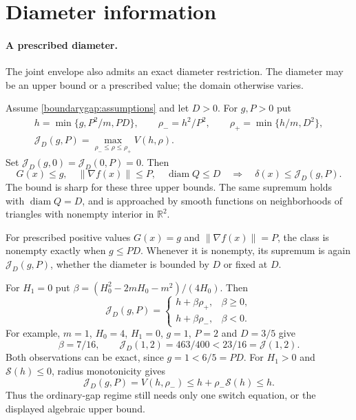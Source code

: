 \section{Diameter information}
\label{compact:diameter}

\paragraph{A prescribed diameter.}
The joint envelope also admits an exact diameter restriction. The
diameter may be an upper bound or a prescribed value; the domain
otherwise varies.

\begin{theorem}
\label{jointdiam:main}
Assume \eqref{boundarygap:assumptions} and let $D>0$. For $g,P>0$ put
\begin{equation}\label{jointdiam:definition}
 \begin{gathered}
 h=\min\{g,P^2/m,PD\},\qquad
 \rho_-=h^2/P^2,\qquad \rho_+=\min\{h/m,D^2\},\\
 \mathcal J_D(g,P)=\max_{\rho_-\le\rho\le\rho_+}V(h,\rho).
 \end{gathered}
\end{equation}
Set $\mathcal J_D(g,0)=\mathcal J_D(0,P)=0$. Then
\[
 G(x)\le g,\quad \|\nabla f(x)\|\le P,\quad
 \operatorname{diam}Q\le D
 \quad\Longrightarrow\quad
 \delta(x)\le\mathcal J_D(g,P).
\]
The bound is sharp for these three upper bounds. The same supremum
holds with $\operatorname{diam}Q=D$, and is approached by smooth
functions on neighborhoods of triangles with nonempty interior in
$\mathbb R^2$.

For prescribed positive values $G(x)=g$ and $\|\nabla f(x)\|=P$,
the class is nonempty exactly when $g\le PD$. Whenever it is
nonempty, its supremum is again $\mathcal J_D(g,P)$, whether the
diameter is bounded by $D$ or fixed at $D$.
\end{theorem}

For $H_1=0$ put
$\beta=(H_0^2-2mH_0-m^2)/(4H_0)$. Then
\begin{equation}\label{jointdiam:constant}
 \mathcal J_D(g,P)=
 \begin{cases}
 h+\beta\rho_+,&\beta\ge0,\\
 h+\beta\rho_-,&\beta<0.
 \end{cases}
\end{equation}
For example, $m=1$, $H_0=4$, $H_1=0$, $g=1$, $P=2$ and
$D=3/5$ give
\[
 \beta=7/16,\qquad
 \mathcal J_D(1,2)=463/400<23/16=\mathcal J(1,2).
\]
Both observations can be exact, since $g=1<6/5=PD$.
For $H_1>0$ and $\mathcal S(h)\le0$, radius monotonicity gives
\begin{equation}\label{jointdiam:ordinary}
 \mathcal J_D(g,P)=V(h,\rho_-)
       \le h+\rho_-\mathcal S(h)\le h.
\end{equation}
Thus the ordinary-gap regime still needs only one switch equation,
or the displayed algebraic upper bound.

